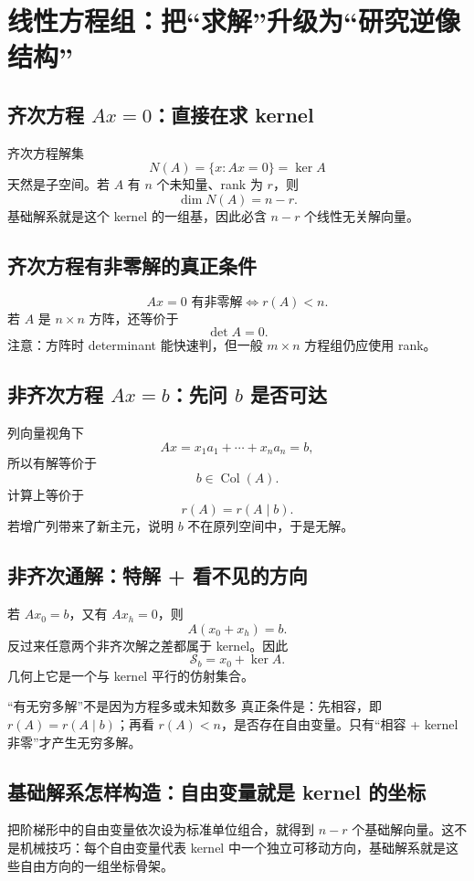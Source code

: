 \documentclass[11pt,a4paper,openany]{ctexbook}
\begin{document}
\chapter{线性方程组：把“求解”升级为“研究逆像结构”}

\section{齐次方程 \texorpdfstring{$Ax=0$}{Ax=0}：直接在求 kernel}
齐次方程解集
\[
N(A)=\{x:Ax=0\}=\ker A
\]
天然是子空间。若 $A$ 有 $n$ 个未知量、rank 为 $r$，则
\[
\dim N(A)=n-r.
\]
基础解系就是这个 kernel 的一组基，因此必含 $n-r$ 个线性无关解向量。

\section{齐次方程有非零解的真正条件}
\[
Ax=0\text{ 有非零解}\iff r(A)<n.
\]
若 $A$ 是 $n\times n$ 方阵，还等价于
\[
\det A=0.
\]
注意：方阵时 determinant 能快速判，但一般 $m\times n$ 方程组仍应使用 rank。

\section{非齐次方程 \texorpdfstring{$Ax=b$}{Ax=b}：先问 \texorpdfstring{$b$}{b} 是否可达}
列向量视角下
\[
Ax=x_1a_1+\cdots+x_na_n=b,
\]
所以有解等价于
\[
b\in\operatorname{Col}(A).
\]
计算上等价于
\[
\boxed{r(A)=r(A\mid b)}.
\]
若增广列带来了新主元，说明 $b$ 不在原列空间中，于是无解。

\section{非齐次通解：特解 + 看不见的方向}
若 $Ax_0=b$，又有 $Ax_h=0$，则
\[
A(x_0+x_h)=b.
\]
反过来任意两个非齐次解之差都属于 kernel。因此
\[
\boxed{\mathcal S_b=x_0+\ker A}.
\]
几何上它是一个与 kernel 平行的仿射集合。

\begin{boundarybox}{“有无穷多解”不是因为方程多或未知数多}
真正条件是：先相容，即 $r(A)=r(A\mid b)$；再看 $r(A)<n$，是否存在自由变量。只有“相容 + kernel 非零”才产生无穷多解。
\end{boundarybox}

\section{基础解系怎样构造：自由变量就是 kernel 的坐标}
把阶梯形中的自由变量依次设为标准单位组合，就得到 $n-r$ 个基础解向量。这不是机械技巧：每个自由变量代表 kernel 中一个独立可移动方向，基础解系就是这些自由方向的一组坐标骨架。
\end{document}
